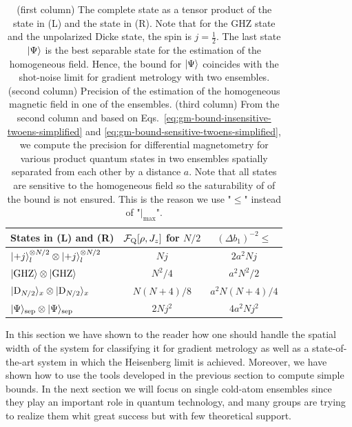 \begin{table}
  \begin{center}
    \begin{tabular}{|l|c|c|}
    \hline
    States in (L) and (R) & $\mathcal{F}_{\textnormal{Q}}[{\textstyle \rho,J_z}]$ for $N/2$ & $(\Delta b_1)^{-2}\leqslant$ \\
    \hline
    $\vert{+j}\rangle_l^{\otimes N/2} \otimes \vert{+j}\rangle_l^{\otimes N/2} $ & $Nj$ & $ 2a^2Nj$ \\
    \hline
    $\vert{\textnormal{GHZ}}\rangle\otimes\vert{\textnormal{GHZ}}\rangle$ & $N^2/4$ & $ a^2N^2/2$\\
    \hline
    $\vert{\ensuremath{\textnormal{D}_{{N/2}}}}\rangle_{x}\otimes \vert{\ensuremath{\textnormal{D}_{{N/2}}}}\rangle_{x}$ & $N(N+4)/8$ & $ a^2N(N+4)/4$\\
      \hline
    $\vert{\Psi}\rangle_{\text{sep}}\otimes\vert{\Psi}\rangle_{\text{sep}}$ & $2Nj^2$  & $ 4a^2Nj^2$ \\
    \hline
    \end{tabular}
  \end{center}
\caption[Bounds on the precision for different states $\ket{\psi}^{(\text{L})}\otimes\ket{\psi}^{(\text{R})}$]{
(first column) The complete state as a tensor product of the state in (L) and the state in (R). Note that for the GHZ state and the unpolarized Dicke state, the spin is $j=\frac{1}{2}$.
The last state $\vert{\Psi}\rangle$ is the best separable state for the estimation of the homogeneous field.
Hence, the bound for $\vert{\Psi}\rangle$ coincides with the shot-noise limit for gradient metrology with two ensembles.
(second column) Precision of the estimation of the homogeneous magnetic field in one of the ensembles.
(third column) From the second column and based on Eqs.~\eqref{eq:gm-bound-insensitive-twoens-simplified} and \eqref{eq:gm-bound-sensitive-twoens-simplified}, we compute the precision for differential magnetometry for various product quantum states in two ensembles spatially separated from each other by a distance $a$.
Note that all states are sensitive to the homogeneous field so the saturability of of the bound is not ensured.
This is the reason we use "$\leqslant$" instead of "$|_{\max}$".
}
\label{tab:result-states-two-ensembles}
\end{table}

In this section we have shown to the reader how one should handle the spatial width of the system for classifying it for gradient metrology as well as a state-of-the-art system in which the Heisenberg limit is achieved.
Moreover, we have shown how to use the tools developed in the previous section to compute simple bounds.
In the next section we will focus on single cold-atom ensembles since they play an important role in quantum technology, and many groups are trying to realize them whit great success but with few theoretical support.

